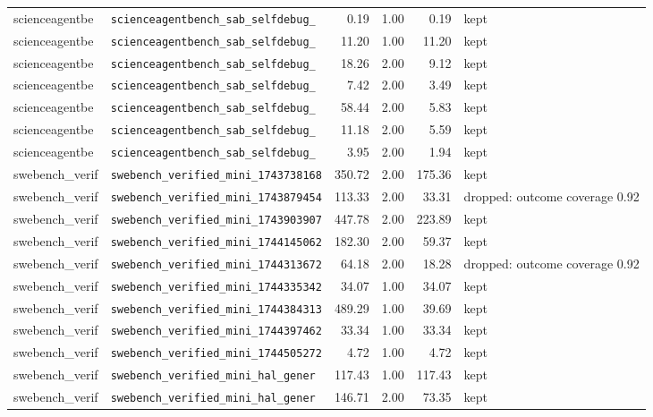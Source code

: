 {\begin{longtable}{llrrrl}
scienceagentbe & \texttt{\scriptsize scienceagentbench\_sab\_selfdebug\_~} & 0.19 & 1.00 & 0.19 & kept \\
scienceagentbe & \texttt{\scriptsize scienceagentbench\_sab\_selfdebug\_~} & 11.20 & 1.00 & 11.20 & kept \\
scienceagentbe & \texttt{\scriptsize scienceagentbench\_sab\_selfdebug\_~} & 18.26 & 2.00 & 9.12 & kept \\
scienceagentbe & \texttt{\scriptsize scienceagentbench\_sab\_selfdebug\_~} & 7.42 & 2.00 & 3.49 & kept \\
scienceagentbe & \texttt{\scriptsize scienceagentbench\_sab\_selfdebug\_~} & 58.44 & 2.00 & 5.83 & kept \\
scienceagentbe & \texttt{\scriptsize scienceagentbench\_sab\_selfdebug\_~} & 11.18 & 2.00 & 5.59 & kept \\
scienceagentbe & \texttt{\scriptsize scienceagentbench\_sab\_selfdebug\_~} & 3.95 & 2.00 & 1.94 & kept \\
swebench\_verif & \texttt{\scriptsize swebench\_verified\_mini\_1743738168} & 350.72 & 2.00 & 175.36 & kept \\
swebench\_verif & \texttt{\scriptsize swebench\_verified\_mini\_1743879454} & 113.33 & 2.00 & 33.31 & dropped: outcome coverage 0.92 \\
swebench\_verif & \texttt{\scriptsize swebench\_verified\_mini\_1743903907} & 447.78 & 2.00 & 223.89 & kept \\
swebench\_verif & \texttt{\scriptsize swebench\_verified\_mini\_1744145062} & 182.30 & 2.00 & 59.37 & kept \\
swebench\_verif & \texttt{\scriptsize swebench\_verified\_mini\_1744313672} & 64.18 & 2.00 & 18.28 & dropped: outcome coverage 0.92 \\
swebench\_verif & \texttt{\scriptsize swebench\_verified\_mini\_1744335342} & 34.07 & 1.00 & 34.07 & kept \\
swebench\_verif & \texttt{\scriptsize swebench\_verified\_mini\_1744384313} & 489.29 & 1.00 & 39.69 & kept \\
swebench\_verif & \texttt{\scriptsize swebench\_verified\_mini\_1744397462} & 33.34 & 1.00 & 33.34 & kept \\
swebench\_verif & \texttt{\scriptsize swebench\_verified\_mini\_1744505272} & 4.72 & 1.00 & 4.72 & kept \\
swebench\_verif & \texttt{\scriptsize swebench\_verified\_mini\_hal\_gener~} & 117.43 & 1.00 & 117.43 & kept \\
swebench\_verif & \texttt{\scriptsize swebench\_verified\_mini\_hal\_gener~} & 146.71 & 2.00 & 73.35 & kept \\

\end{longtable}}
